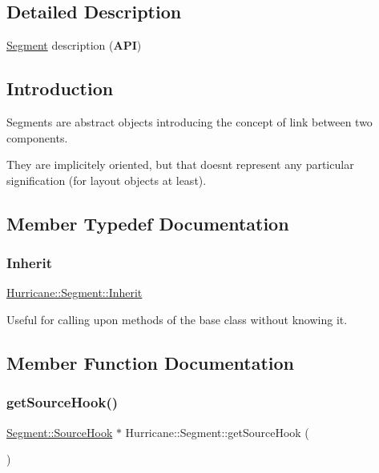 \subsection{Detailed Description}
\mbox{\hyperlink{classHurricane_1_1Segment}{Segment}} description ({\bfseries A\+PI}) 

\hypertarget{classHurricane_1_1Segment_secSegmentIntro}{}\subsection{Introduction}\label{classHurricane_1_1Segment_secSegmentIntro}
Segments are abstract objects introducing the concept of link between two components.

They are implicitely oriented, but that doesn\textquotesingle{}t represent any particular signification (for layout objects at least). 

\subsection{Member Typedef Documentation}
\mbox{\label{classHurricane_1_1Segment_a2f616ba119bb6e9751659814bdbf0320}} 
\subsubsection{\texorpdfstring{Inherit}{Inherit}}
{\footnotesize\ttfamily \mbox{\hyperlink{classHurricane_1_1Segment_a2f616ba119bb6e9751659814bdbf0320}{Hurricane\+::\+Segment\+::\+Inherit}}}

Useful for calling upon methods of the base class without knowing it. 

\subsection{Member Function Documentation}
\mbox{\label{classHurricane_1_1Segment_aa9d0303b444b44d7b8e47d42ac7151eb}} 
\subsubsection{\texorpdfstring{get\+Source\+Hook()}{getSourceHook()}}
{\footnotesize\ttfamily \mbox{\hyperlink{classHurricane_1_1Segment_1_1SourceHook}{Segment\+::\+Source\+Hook}} $\ast$ Hurricane\+::\+Segment\+::get\+Source\+Hook (\begin{DoxyParamCaption}{ }\end{DoxyParamCaption})\hspace{0.3cm}{\ttfamily [inline]}}

